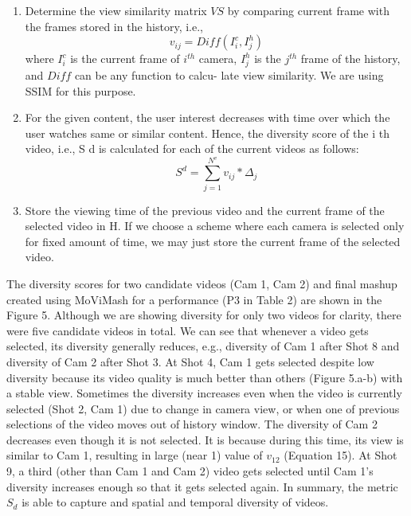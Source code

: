 \documentclass{new}
\begin{document}
\begin{enumerate}
\item Determine the view similarity matrix $V S$ by comparing current frame with the frames stored in the history, i.e.,
\begin{equation}
        v_{ij} = Diff(I^{c}_{i} , I^{h}_{j} )
\end{equation}
where $I_i^c$ is the current frame of $i^{th}$ camera, $I_j^h$ is the $j^{th}$
frame of the history, and $Diff$ can be any function to calcu-
late view similarity. We are using SSIM \cite{17} for this purpose.

\item For the given content, the user interest decreases with time
over which the user watches same or similar content. Hence,
the diversity score of the i th video, i.e., S d is calculated for
each of the current videos as follows:
\begin{equation}
        S^d = \sum_{j=1}^{N^v}v_{ij}*\Delta _j
\end{equation}

\item Store the viewing time of the previous video and the current
frame of the selected video in H. If we choose a scheme
where each camera is selected only for fixed amount of time,
we may just store the current frame of the selected video.


\end{enumerate}
The diversity scores for two candidate videos (Cam 1, Cam 2)
and final mashup created using MoViMash for a performance (P3
in Table 2) are shown in the Figure 5. Although we are showing
diversity for only two videos for clarity, there were five candidate
videos in total. We can see that whenever a video gets selected,
its diversity generally reduces, e.g., diversity of Cam 1 after Shot 8
and diversity of Cam 2 after Shot 3. At Shot 4, Cam 1 gets selected
despite low diversity because its video quality is much better than
others (Figure 5.a-b) with a stable view. Sometimes the diversity
increases even when the video is currently selected (Shot 2, Cam 1)
due to change in camera view, or when one of previous selections
of the video moves out of history window. The diversity of Cam 2
decreases even though it is not selected. It is because during this
time, its view is similar to Cam 1, resulting in large (near 1) value
of $v_{12}$ (Equation 15). At Shot 9, a third (other than Cam 1 and Cam
2) video gets selected until Cam 1's diversity increases enough so
that it gets selected again. In summary, the metric $S_d$ is able to
capture and spatial and temporal diversity of videos.
\end{document}
